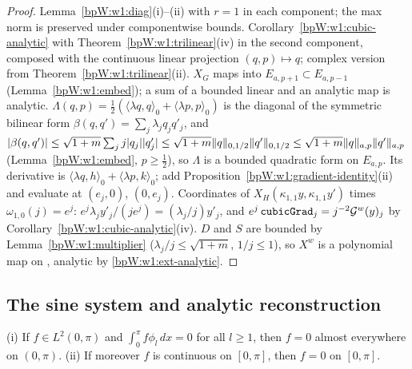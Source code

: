 \begin{proof}
\label{stepW:w1:hlin}
Lemma~\ref{bpW:w1:diag}(i)--(ii) with $r=1$ in each component; the max norm is preserved under componentwise bounds.
\label{stepW:w1:hnonlin}
Corollary~\ref{bpW:w1:cubic-analytic} with Theorem~\ref{bpW:w1:trilinear}(iv) in the second component, composed with the
continuous linear projection $(q,p)\mapsto q$; complex version from Theorem~\ref{bpW:w1:trilinear}(ii).
\label{stepW:w1:hsum}
$X_G$ maps into $E_{a,p+1}\subset E_{a,p-1}$ (Lemma~\ref{bpW:w1:embed}); a sum of a bounded linear and an analytic map
is analytic.
\label{stepW:w1:hham}
$\Lambda(q,p)=\frac12(\langle\lambda q,q\rangle_0+\langle\lambda p,p\rangle_0)$ is the diagonal of the symmetric
bilinear form $\beta(q,q')=\sum_j\lambda_jq_jq'_j$, and $\lvert \beta(q,q')\rvert\le\sqrt{1+m}\sum_jj\lvert q_j\rvert\lvert q'_j\rvert\le
\sqrt{1+m}\lVert q\rVert_{0,1/2}\lVert q'\rVert_{0,1/2}\le\sqrt{1+m}\lVert q\rVert_{a,p}\lVert q'\rVert_{a,p}$ (Lemma~\ref{bpW:w1:embed}, $p\ge\frac12$),
so $\Lambda$ is a bounded quadratic form on $E_{a,p}$. Its derivative is
$\langle\lambda q,h\rangle_0+\langle\lambda p,k\rangle_0$; add Proposition~\ref{bpW:w1:gradient-identity}(ii) and
evaluate at $(e_j,0)$, $(0,e_j)$.
\label{stepW:w1:hfrozen}
Coordinates of $X_H(\kappa_{1,1}y,\kappa_{1,1}y')$ times $\omega_{1,0}(j)=e^j$: $e^j\lambda_jy'_j/(je^j)=(\lambda_j/j)y'_j$,
and $e^j\,\texttt{cubicGrad}_j=j^{-2}\mathcal G^w(y)_j$ by Corollary~\ref{bpW:w1:cubic-analytic}(iv). $D$ and $S$ are bounded
by Lemma~\ref{bpW:w1:multiplier} ($\lambda_j/j\le\sqrt{1+m}$, $1/j\le1$), so $X^w$ is a polynomial map on
, analytic by \ref{bpW:w1:ext-analytic}.
\end{proof}

\subsection{The sine system and analytic reconstruction}\label{bpW:w1:sines}

\begin{lemma}\label{bpW:w1:sine-completeness}
(i) If $f\in L^2(0,\pi)$ and $\int_0^\pi f\phi_l\,dx=0$ for all $l\ge1$, then $f=0$ almost everywhere on $(0,\pi)$.
(ii) If moreover $f$ is continuous on $[0,\pi]$, then $f=0$ on $[0,\pi]$.
\end{lemma}

